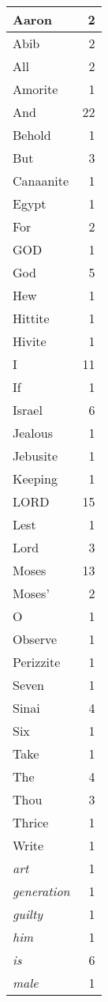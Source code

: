 \begin{center}
\begin{longtable}{l|r}
\hline \hline
\endlastfoot
Aaron & 2 \\ \hline
Abib & 2 \\ \hline
All & 2 \\ \hline
Amorite & 1 \\ \hline
And & 22 \\ \hline
Behold & 1 \\ \hline
But & 3 \\ \hline
Canaanite & 1 \\ \hline
Egypt & 1 \\ \hline
For & 2 \\ \hline
GOD & 1 \\ \hline
God & 5 \\ \hline
Hew & 1 \\ \hline
Hittite & 1 \\ \hline
Hivite & 1 \\ \hline
I & 11 \\ \hline
If & 1 \\ \hline
Israel & 6 \\ \hline
Jealous & 1 \\ \hline
Jebusite & 1 \\ \hline
Keeping & 1 \\ \hline
LORD & 15 \\ \hline
Lest & 1 \\ \hline
Lord & 3 \\ \hline
Moses & 13 \\ \hline
Moses' & 2 \\ \hline
O & 1 \\ \hline
Observe & 1 \\ \hline
Perizzite & 1 \\ \hline
Seven & 1 \\ \hline
Sinai & 4 \\ \hline
Six & 1 \\ \hline
Take & 1 \\ \hline
The & 4 \\ \hline
Thou & 3 \\ \hline
Thrice & 1 \\ \hline
Write & 1 \\ \hline
\emph{art} & 1 \\ \hline
\emph{generation} & 1 \\ \hline
\emph{guilty} & 1 \\ \hline
\emph{him} & 1 \\ \hline
\emph{is} & 6 \\ \hline
\emph{male} & 1 \\ \hline

\end{longtable}
\end{center}
